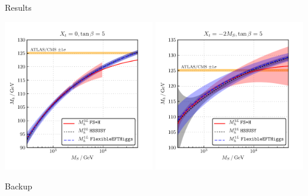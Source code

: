 \documentclass[hyperref={pdfpagelabels=false},ngerman]{beamer}
\begin{document}
\begin{frame}{Results}
  \begin{center}
    \includegraphics[width=0.49\textwidth]{plots/kuts/Mh_MS_TB-5_Xt-0}\hfill
    \includegraphics[width=0.49\textwidth]{plots/kuts/Mh_MS_TB-5_Xt--2}
  \end{center}
\end{frame}

\begin{frame}[noframenumbering]
  \begin{center}
    \Huge Backup
  \end{center}
\end{frame}
\end{document}

